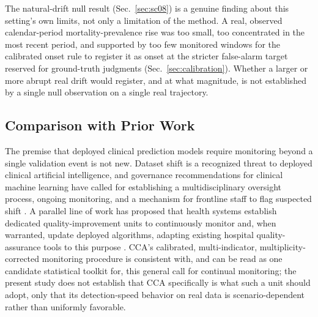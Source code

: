 \documentclass[preprintsapa,article,submit,oneauthor]{Definitions/mdpi}
\begin{document}
The natural-drift null result (Sec.~\ref{sec:sc08}) is a genuine finding about this setting's own limits, not only a limitation of the method. A real, observed calendar-period mortality-prevalence rise was too small, too concentrated in the most recent period, and supported by too few monitored windows for the calibrated onset rule to register it as onset at the stricter false-alarm target reserved for ground-truth judgments (Sec.~\ref{sec:calibration}). Whether a larger or more abrupt real drift would register, and at what magnitude, is not established by a single null observation on a single real trajectory.

\subsection{Comparison with Prior Work}\label{sec:disc-priorwork}

The premise that deployed clinical prediction models require monitoring beyond a single validation event is not new. Dataset shift is a recognized threat to deployed clinical artificial intelligence, and governance recommendations for clinical machine learning have called for establishing a multidisciplinary oversight process, ongoing monitoring, and a mechanism for frontline staff to flag suspected shift \citep{finlayson2021}. A parallel line of work has proposed that health systems establish dedicated quality-improvement units to continuously monitor and, when warranted, update deployed algorithms, adapting existing hospital quality-assurance tools to this purpose \citep{feng2022}. CCA's calibrated, multi-indicator, multiplicity-corrected monitoring procedure is consistent with, and can be read as one candidate statistical toolkit for, this general call for continual monitoring; the present study does not establish that CCA specifically is what such a unit should adopt, only that its detection-speed behavior on real data is scenario-dependent rather than uniformly favorable.
\end{document}
